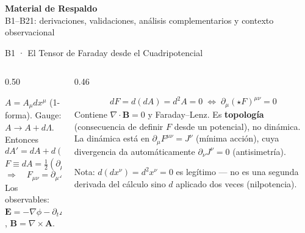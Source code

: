 \documentclass[aspectratio=169,9pt]{beamer}
\begin{document}
{
\begin{frame}[plain]
\begin{center}
  \vspace{1.6cm}
  {\color{soft}\LARGE\bfseries Material de Respaldo}\\[0.5cm]
  {\color{gold}\small B1--B21: derivaciones, validaciones, an\'alisis complementarios y contexto observacional}
\end{center}
\end{frame}
}

\begin{frame}{B1 · El Tensor de Faraday desde el Cuadripotencial}
\begin{columns}[T]
\begin{column}{0.50\textwidth}
  \begin{tcolorbox}[EQ={La 2-forma de Faraday e invariancia de gauge}]
    \scriptsize
    $A=A_\mu dx^\mu$ (1-forma). Gauge: $A\to A+d\Lambda$. Entonces
    \[
      dA'=dA+d(d\Lambda)=dA \quad (d^2=0)
    \]
    \[
      F\equiv dA=\tfrac12(\partial_\mu A_\nu-\partial_\nu A_\mu)\,
        dx^\mu\!\wedge dx^\nu
    \]
    \[
      \Rightarrow\quad F_{\mu\nu}=\partial_\mu A_\nu-\partial_\nu A_\mu
    \]
    Los observables: $\mathbf E=-\nabla\phi-\partial_t\mathbf A$,\;
    $\mathbf B=\nabla\times\mathbf A$.
  \end{tcolorbox}
\end{column}
\begin{column}{0.46\textwidth}
  \begin{tcolorbox}[RES={Identidad de Bianchi $\equiv$ par homog\'eneo}]
    \scriptsize
    \[
      dF=d(dA)=d^2A=0
      \;\Longleftrightarrow\;
      \partial_\mu(\star F)^{\mu\nu}=0
    \]
    Contiene $\nabla\!\cdot\!\mathbf B=0$ y Faraday--Lenz.
    Es \textbf{topolog\'ia} (consecuencia de definir $F$ desde un
    potencial), no din\'amica. La din\'amica est\'a en
    $\partial_\mu F^{\mu\nu}=J^\nu$ (m\'inima acci\'on), cuya divergencia
    da autom\'aticamente $\partial_\nu J^\nu=0$ (antisimetr\'ia).
  \end{tcolorbox}
  \vspace{0.1cm}
  {\scriptsize\color{INF3} Nota: $d(dx^\nu)=d^2x^\nu=0$ es leg\'itimo ---
  no es una segunda derivada del c\'alculo sino $d$ aplicado dos veces
  (nilpotencia).}
\end{column}
\end{columns}
\end{frame}
\end{document}
